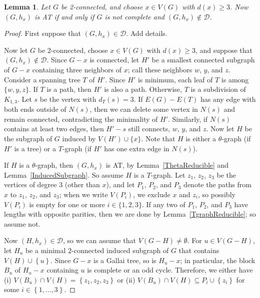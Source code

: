\documentclass[12pt]{article}
\theoremstyle{plain}
\newtheorem{lem}[thm]{Lemma}
\theoremstyle{definition}
\theoremstyle{remark}
\newcommand{\fancy}[1]{\mathcal{#1}}
\newcommand{\D}{\fancy{D}}
\newcommand{\set}[1]{\left\{ #1 \right\}}
\newcommand{\irange}[1]{\left\{1,\ldots,#1\right\}}
\def\D{\fancy{D}}
\begin{document}



\begin{lem}\label{TwoConnectedClassification}
Let $G$ be 2-connected, and choose $x\in V(G)$ with $d(x)\ge 3$. 
Now $(G,h_x)$ is AT if and only if $G$ is not complete and $(G,h_x) \not \in \D$.
\end{lem}
\begin{proof}
	First suppose that $(G,h_x)\in \D$.  Add details.
	
	Now let $G$ be 2-connected, choose $x\in V(G)$ with $d(x)\ge 3$, and suppose that
	$(G,h_x)\notin \D$.
	Since $G-x$ is connected, let $H'$ be a smallest connected
	subgraph of $G-x$ containing three neighbors of $x$; call these neighbors
	$w$, $y$, and $z$.  
	Consider a spanning tree $T$ of $H'$.  Since $H'$ is minimum, each leaf of $T$
	is among $\{w, y, z\}$.  If $T$ is a path, then $H'$ is also a path. 
	Otherwise, $T$ is a subdivision of $K_{1,3}$.  Let $s$ be the vertex with
	$d_T(s)=3$.  If $E(G)-E(T)$ has any edge with
	both ends outside of $N(s)$, then we can delete some vertex in $N(s)$ and remain
	connected, contradicting the minimality of $H'$.  Similarly, if $N(s)$ contains
	at least two edges, then $H'-s$ still connects, $w$, $y$, and $z$.  Now let $H$
	be the subgraph of $G$ induced by $V(H')\cup\{x\}$.  Note that $H$ is either
	a $\theta$-graph (if $H'$ is a tree) or a $T$-graph (if $H'$ has one extra edge in
	$N(s)$).  
	
	If $H$ is a $\theta$-graph, then $(G,h_x)$ is AT, by
	Lemma~\ref{ThetaReducible} and Lemma~\ref{InducedSubgraph}.
	So assume $H$ is a $T$-graph.  Let $z_1$, $z_2$, $z_3$ be the vertices
	of degree 3 (other than $x$), and let $P_1$, $P_2$, and $P_3$ denote the paths
	from $x$ to $z_1$, $z_2$, and $z_3$; when we write $V(P_i)$, we exclude $x$ and
	$z_i$, so possibly $V(P_i)$ is empty for one or more $i\in\{1,2,3\}$.
	If any two of $P_1$, $P_2$, and $P_3$ have lengths with opposite parities, then
	we are done by Lemma~\ref{TgraphReducible}; so assume not.  
	
	Now $(H,h_x)\in \D$, so we can assume that $V(G-H) \ne \emptyset$.  
	For $u \in V(G-H)$, let $H_u$ be a minimal $2$-connected induced subgraph of $G$ that contains $V(H) \cup \set{u}$.  
	Since $G-x$ is a Gallai tree, so is $H_u-x$; in particular, the block $B_u$ of $H_u-x$ containing $u$ is complete or an odd cycle.  
	Therefore, we either have (i) $V(B_u) \cap V(H) = \set{z_1, z_2,z_3}$ or (ii)  $V(B_u) \cap V(H) \subseteq P_i \cup \set{z_i}$ for some $i \in \irange{3}$.
	

\end{proof}
\end{document}
